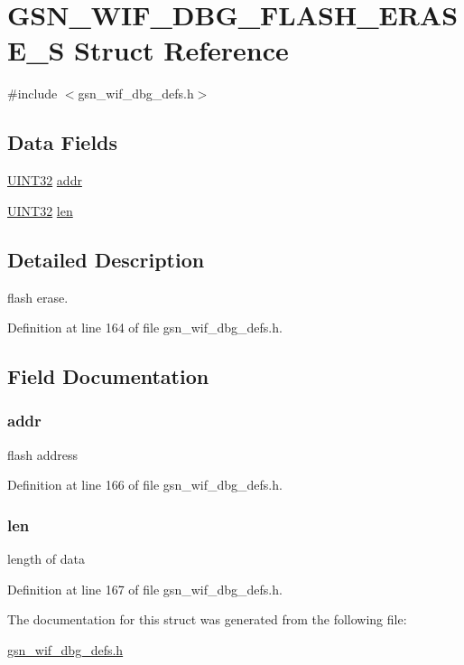 \hypertarget{a00329}{
\section{GSN\_\-WIF\_\-DBG\_\-FLASH\_\-ERASE\_\-S Struct Reference}
\label{a00329}
}


{\ttfamily \#include $<$gsn\_\-wif\_\-dbg\_\-defs.h$>$}

\subsection*{Data Fields}
\begin{DoxyCompactItemize}
\item 
\hyperlink{a00660_gae1e6edbbc26d6fbc71a90190d0266018}{UINT32} \hyperlink{a00329_a211571ed47a0fee2d898236395234dab}{addr}
\item 
\hyperlink{a00660_gae1e6edbbc26d6fbc71a90190d0266018}{UINT32} \hyperlink{a00329_ab9abc6ede61238a05664f9c37e4412c3}{len}
\end{DoxyCompactItemize}


\subsection{Detailed Description}
flash erase. 

Definition at line 164 of file gsn\_\-wif\_\-dbg\_\-defs.h.



\subsection{Field Documentation}
\hypertarget{a00329_a211571ed47a0fee2d898236395234dab}{
\subsubsection[{addr}]{ {\bf addr}}}
\label{a00329_a211571ed47a0fee2d898236395234dab}
flash address 

Definition at line 166 of file gsn\_\-wif\_\-dbg\_\-defs.h.

\hypertarget{a00329_ab9abc6ede61238a05664f9c37e4412c3}{
\subsubsection[{len}]{ {\bf len}}}
\label{a00329_ab9abc6ede61238a05664f9c37e4412c3}
length of data 

Definition at line 167 of file gsn\_\-wif\_\-dbg\_\-defs.h.



The documentation for this struct was generated from the following file:\begin{DoxyCompactItemize}
\item 
\hyperlink{a00609}{gsn\_\-wif\_\-dbg\_\-defs.h}\end{DoxyCompactItemize}
